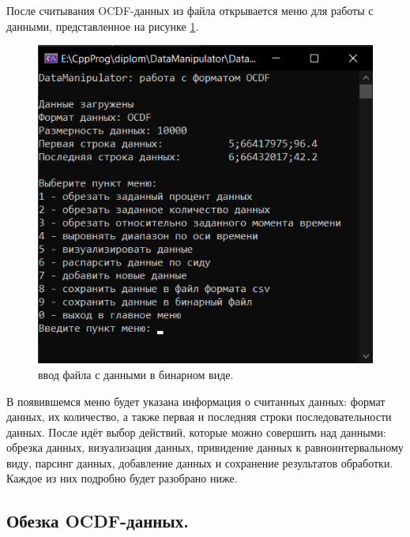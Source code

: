 {\standartFont

  \par После считывания OCDF-данных из файла открывается меню для работы с данными, представленное на рисунке \ref{fig:OCDFmenu}.

  \begin{figure}[H]
    \centering
    \includegraphics{images/forDataManipulator/OCDFmenu.png}
    \caption{ввод файла с данными в бинарном виде.} 
    \label{fig:OCDFmenu}
  \end{figure}

  \par В появившемся меню будет указана информация о считанных данных: формат данных, их количество, а также первая и последняя строки последовательности данных. После идёт выбор действий, которые можно совершить над данными: обрезка данных, визуализация данных, привидение данных к равноинтервальному виду, парсинг данных, добавление данных и сохранение результатов обработки. Каждое из них подробно будет разобрано ниже.

  \par
}

\subsection{ \standartTitleFont
  Обезка OCDF-данных. 
} \label{subsec:OCDFCut}

